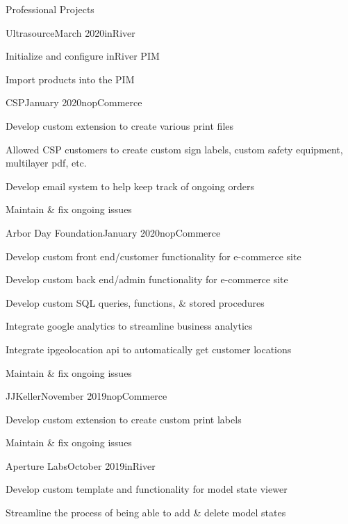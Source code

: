 \documentclass{resume} %
\begin{document}
\begin{rSection}{Professional Projects}
    \begin{rSubsection}{Ultrasource}{March 2020}{inRiver}{}
        \item Initialize and configure inRiver PIM
        \item Import products into the PIM
    \end{rSubsection}

    \begin{rSubsection}{CSP}{January 2020}{nopCommerce}{}
        \item Develop custom extension to create various print files
        \item Allowed CSP customers to create custom sign labels, custom safety equipment, multilayer pdf, etc.
        \item Develop email system to help keep track of ongoing orders
        \item Maintain \& fix ongoing issues
    \end{rSubsection}

    \begin{rSubsection}{Arbor Day Foundation}{January 2020}{nopCommerce}{}
        \item Develop custom front end/customer functionality for e-commerce site
        \item Develop custom back end/admin functionality for e-commerce site
        \item Develop custom SQL queries, functions, \& stored procedures
        \item Integrate google analytics to streamline business analytics
        \item Integrate ipgeolocation api to automatically get customer locations
        \item Maintain \& fix ongoing issues
    \end{rSubsection}

    \begin{rSubsection}{JJKeller}{November 2019}{nopCommerce}{}
        \item Develop custom extension to create custom print labels
        \item Maintain \& fix ongoing issues
    \end{rSubsection}

    \begin{rSubsection}{Aperture Labs}{October 2019}{inRiver}{}
        \item Develop custom template and functionality for model state viewer
        \item Streamline the process of being able to add \& delete model states
    \end{rSubsection}


\end{rSection}
\end{document}
